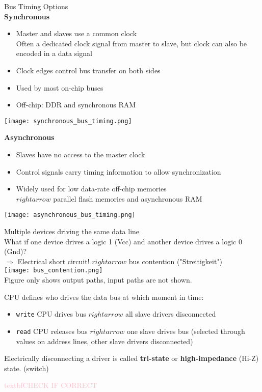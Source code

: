 \begin{theorem}{Bus Timing Options}\\
    \textbf{Synchronous}
    \begin{itemize}
        \item Master and slaves use a common clock\\
        Often a dedicated clock signal from master to slave, but clock can also be encoded in a data signal
        \item Clock edges control bus transfer on both sides
        \item Used by most on-chip buses
        \item Off-chip: DDR and synchronous RAM
    \end{itemize}
    \texttt{[image: synchronous\_bus\_timing.png]}

    \textbf{Asynchronous}
    \begin{itemize}
        \item Slaves have no access to the master clock
        \item Control signals carry timing information to allow synchronization
        \item Widely used for low data-rate off-chip memories\\
        $rightarrow$ parallel flash memories and asynchronous RAM
    \end{itemize}
    \texttt{[image: asynchronous\_bus\_timing.png]}
\end{theorem}

\begin{corollary}{Multiple devices driving the same data line}\\
    What if one device drives a logic 1 (Vcc) and another device drives a logic 0 (Gnd)?\\
    $\Rightarrow$ Electrical short circuit! $rightarrow$ bus contention ("Streitigkeit")\\
    \texttt{[image: bus\_contention.png]}\\
    \small{Figure only shows output paths, input paths are not shown.}

    \tcblower
    CPU defines who drives the data bus at which moment in time:
    \begin{itemize}
        \item \texttt{write} CPU drives bus $rightarrow$ all slave drivers disconnected
        \item \texttt{read} CPU releases bus $rightarrow$ one slave drives bus (selected through values on address lines, other slave drivers disconnected)
    \end{itemize}
    
    Electrically disconnecting a driver is called \textbf{tri-state} or \textbf{high-impedance} (Hi-Z) state. (switch)
    
    \textcolor{pink}{textbf{CHECK IF CORRECT}}
\end{corollary}